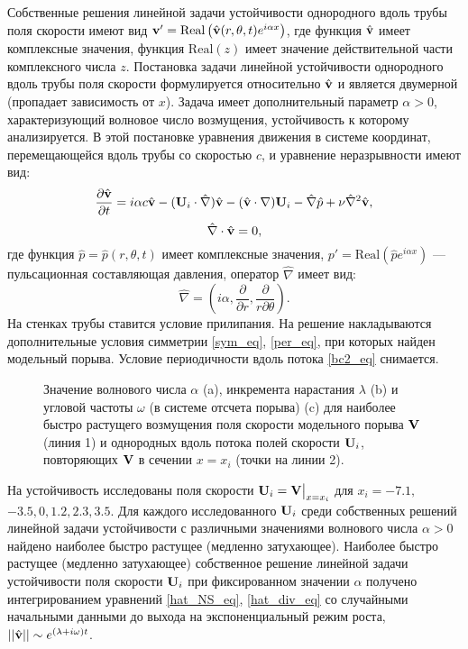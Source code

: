 Собственные решения линейной задачи устойчивости однородного вдоль трубы поля скорости имеют вид $\mathbf{v}' = \mathrm{Real}\left(\hat {\mathbf{v}} (r, \theta, t) e^{i \alpha x}\right)$, где функция $\hat {\mathbf{v}}$ имеет комплексные значения, функция $\mathrm{Real}(z)$ имеет значение действительной части комплексного числа $z$. Постановка задачи линейной устойчивости однородного вдоль трубы поля скорости формулируется относительно $\hat {\mathbf{v}}$ и является двумерной (пропадает зависимость от $x$). Задача имеет дополнительный параметр $\alpha > 0$, характеризующий волновое число возмущения, устойчивость к которому анализируется. В этой постановке уравнения движения в системе координат, перемещающейся вдоль трубы со скоростью $c$, и уравнение неразрывности имеют вид: 
\begin{equation} \label{hat_NS_eq}
\frac{\partial \hat {\mathbf{v}}}{\partial t} = i \alpha  c \hat {\mathbf{v}} - (\mathbf{U}_i \cdot \hat \nabla) \hat {\mathbf{v}} - (\hat {\mathbf{v}} \cdot \nabla) \mathbf{U}_i - \hat \nabla \hat p + \nu \hat \nabla^2 \hat {\mathbf{v}},
\end{equation}
\begin{equation} \label{hat_div_eq}
\hat \nabla \cdot \hat {\mathbf{v}} = 0,
\end{equation}
где функция $\hat p = \hat p(r,\theta,t)$ имеет комплексные значения, $p' = \mathrm{Real}\left(\hat p e^{i \alpha x}\right)$ --- пульсационная составляющая давления, оператор $\hat \nabla$ имеет вид: 
\begin{equation*}
\hat \nabla = \left( i\alpha, \frac{\partial}{\partial r}, \frac{\partial}{r \partial \theta} \right).
\end{equation*}
На стенках трубы ставится условие прилипания. На решение накладываются дополнительные условия симметрии \eqref{sym_eq}, \eqref{per_eq}, при которых найден модельный порыва. Условие периодичности вдоль потока \eqref{bc2_eq} снимается. 

\begin{figure}
\caption{Значение волнового числа $\alpha$ (a), инкремента нарастания $\lambda$ (b) и угловой частоты $\omega$ (в системе отсчета порыва) (c) для наиболее быстро растущего возмущения поля скорости модельного порыва $\mathbf{V}$ (линия 1) и однородных вдоль потока полей скорости $\mathbf{U}_i$, повторяющих $\mathbf{V}$ в сечении $x = x_i$ (точки на линии 2).}
\label{cs_lin_pic}
\end{figure}

На устойчивость исследованы поля скорости $\mathbf{U}_i = \mathbf{V}\big|_{x=x_i}$ для $x_i = -7.1,$ $-3.5, 0, 1.2, 2.3, 3.5$.  Для каждого исследованного $\mathbf{U}_i$ среди собственных решений линейной задачи устойчивости с различными значениями волнового числа $\alpha >0$ найдено наиболее быстро растущее (медленно затухающее). Наиболее быстро растущее (медленно затухающее) собственное решение линейной задачи устойчивости поля скорости $\mathbf{U}_i$ при фиксированном значении $\alpha$ получено интегрированием уравнений \eqref{hat_NS_eq}, \eqref{hat_div_eq} со случайными начальными данными до выхода на экспоненциальный режим роста, $||\hat {\mathbf{v}}|| \sim e^{(\lambda + i\omega) t}$. 

